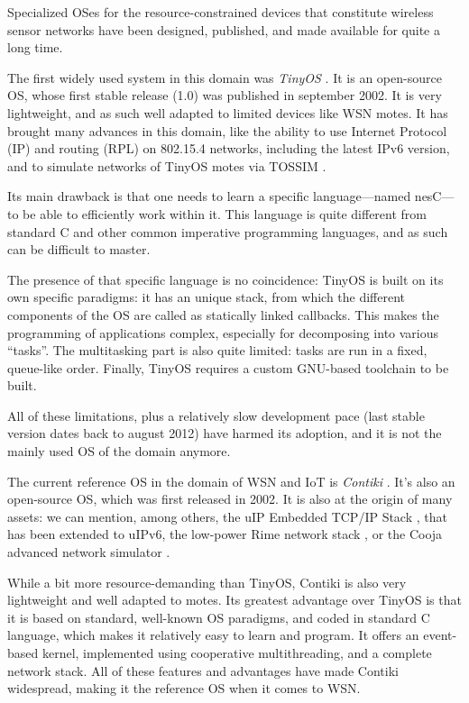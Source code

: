 \documentclass[a4paper,twoside]{article}
\begin{document}
Specialized OSes for the resource-constrained devices that constitute
wireless sensor networks have been designed, published, and made available
for quite a long time.


The first widely used system in this domain was \emph{TinyOS} \cite{TinyOS}.
It is an open-source OS, whose first stable release (1.0) was published in
september 2002. It is very lightweight, and as such well adapted to limited
devices like WSN motes.  It has brought many advances in this domain, like
the ability to use Internet Protocol (IP) and routing (RPL) on 802.15.4
networks, including the latest IPv6 version, and to simulate networks
of TinyOS motes via TOSSIM \cite{TOSSIM}.

Its main drawback is that one needs to learn a specific language---named
nesC---to be able to efficiently work within it. This language is quite
different from standard C and other common imperative programming languages,
and as such can be difficult to master.

The presence of that specific language is no coincidence: TinyOS is built
on its own specific paradigms: it has an unique stack, from which the
different components of the OS are called as statically linked callbacks.
This makes the programming of applications complex, especially for
decomposing into various ``tasks''. The multitasking part is also
quite limited: tasks are run in a fixed, queue-like order. Finally,
TinyOS requires a custom GNU-based toolchain to be built.

All of these limitations, plus a relatively slow development pace (last
stable version dates back to august 2012) have harmed its adoption,
and it is not the mainly used OS of the domain anymore.


The current reference OS in the domain of WSN and IoT is \emph{Contiki}
\cite{ContikiOS}. It's also an open-source OS, which was first released
in 2002. It is also at the origin of many assets: we can mention, among
others, the uIP Embedded TCP/IP Stack \cite{uip}, that has been extended
to uIPv6, the low-power Rime network stack \cite{Rime}, or the Cooja advanced
network simulator \cite{Cooja}.

While a bit more resource-demanding than TinyOS, Contiki is also very
lightweight and well adapted to motes. Its greatest advantage over TinyOS
is that it is based on standard, well-known OS paradigms, and coded
in standard C language, which makes it relatively easy to learn and program.
It offers an event-based kernel, implemented using cooperative multithreading,
and a complete network stack. All of these features and advantages have made
Contiki widespread, making it the reference OS when it comes to WSN.
\end{document}
